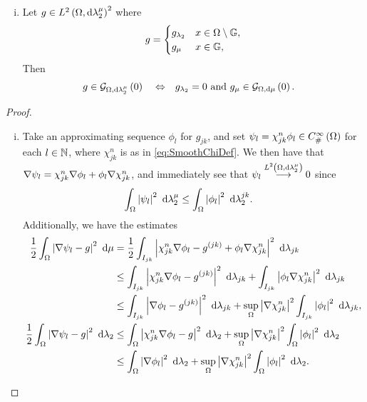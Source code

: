 \begin{prop}
\begin{enumerate}[(i)]
		\item Let $g\in L^{2}\left( \Omega,\mathrm{d} \lambda_2^{\mu} \right)^2$ where
	\begin{align*}
		g = \begin{cases} g_{\lambda_2} & x\in\Omega\setminus\mathbb{G}, \\ g_{\mu} & x\in\mathbb{G}, \end{cases}
	\end{align*}
	Then 
	\begin{align*}
		g\in\mathcal{G}_{ \Omega, \mathrm{d}\lambda_2^{\mu}}\left( 0 \right)
		\quad\Leftrightarrow\quad &
		g_{\lambda_2} = 0 \text{ and } g_{\mu}\in\mathcal{G}_{ \Omega, \mathrm{d}\mu}\left( 0 \right).
	\end{align*}
	\end{enumerate}
\end{prop}
\begin{proof}
	\begin{enumerate}[(i)]
		\item Take an approximating sequence $\phi_l$ for $g_{jk}$, and set $\psi_l = \chi_{jk}^n\phi_l\in C^{\infty}_{\#}\left( \Omega \right)$ for each $l\in\mathbb{N}$, where $\chi_{jk}^n$ is as in \eqref{eq:SmoothChiDef}.
		We then have that $\nabla\psi_l = \chi_{jk}^n\nabla\phi_l + \phi_l\nabla\chi_{jk}^n$, and immediately see that $\psi_l\overset{L^{2}\left( \Omega,\mathrm{d} \lambda_2^{\mu} \right)}{\longrightarrow}0$ since
		\begin{align*}
			\int_{\Omega}\left\lvert  \psi_l  \right\rvert^2 \ \mathrm{d}\lambda_2^{\mu}
			&\leq \int_{\Omega}\left\lvert  \phi_l  \right\rvert^2 \ \mathrm{d}\lambda_2^{jk}.
		\end{align*}
		Additionally, we have the estimates
		\begin{align*}
			\recip{2}\integral{\ddom}{\abs{ \grad\psi_l - g }^2}{\ddmes}
			&= \recip{2}\integral{I_{jk}}{\abs{ \chi_{jk}^n\grad\phi_l - g^{(jk)}  + \phi_l\grad\chi_{jk}^n }^2}{\lambda_{jk}} \\
			&\leq \integral{I_{jk}}{\abs{ \chi_{jk}^n\grad\phi_l - g^{(jk)} }^2}{\lambda_{jk}}
			+ \integral{I_{jk}}{\abs{ \phi_l\grad\chi_{jk}^n }^2}{\lambda_{jk}} \\
			&\leq \integral{I_{jk}}{\abs{ \grad\phi_l - g^{(jk)} }^2}{\lambda_{jk}}
			+ \sup_{\ddom}\abs{\grad\chi_{jk}^n}^2 \integral{I_{jk}}{\abs{ \phi_l }^2}{\lambda_{jk}}, \\
			\recip{2}\integral{\ddom}{\abs{ \grad\psi_l - g }^2}{\lambda_2}
			&\leq \integral{\ddom}{\abs{ \chi_{jk}^n\grad\phi_l - g }^2}{\lambda_2}
			+ \sup_{\ddom}\abs{\grad\chi_{jk}^n}^2 \integral{\ddom}{\abs{ \phi_l }^2}{\lambda_2} \\
			&\leq \integral{\ddom}{\abs{ \grad\phi_l }^2}{\lambda_2}
			+ \sup_{\ddom}\abs{\grad\chi_{jk}^n}^2 \integral{\ddom}{\abs{ \phi_l }^2}{\lambda_2}.

\end{align*}
\end{enumerate}
\end{proof}
